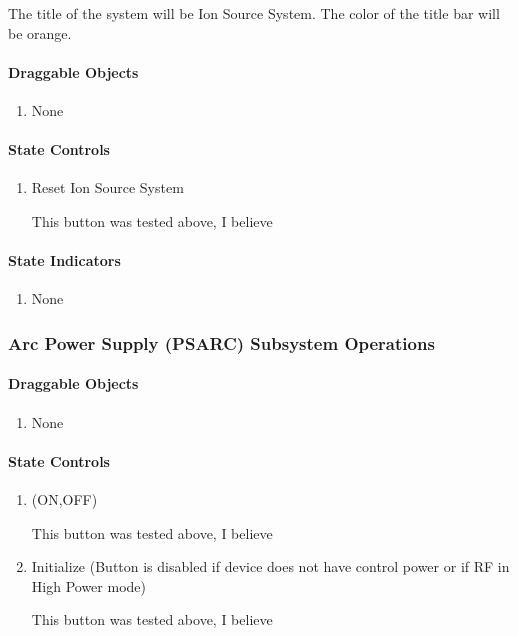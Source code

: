 \documentclass[11pt]{book}		%
\begin{document}
The title of the system will be Ion Source System.  The color of the title bar will be orange.

\paragraph{Draggable Objects}

\begin{enumerate}
 \item None
\end{enumerate}

\paragraph{State Controls}

\begin{enumerate}
 \item Reset Ion Source System

\color{red}
This button was tested above, I believe
\color{black}

\end{enumerate}

\paragraph{State Indicators}

\begin{enumerate}
 \item None
\end{enumerate}


\subsubsection{Arc Power Supply (PSARC) Subsystem Operations}

\paragraph{Draggable Objects}

\begin{enumerate}
 \item None
\end{enumerate}

\paragraph{State Controls}

\begin{enumerate}
 \item (ON,OFF)

\color{red}
This button was tested above, I believe
\color{black}

 \item Initialize (Button is disabled if device does not have control power or if RF in High Power mode)

\color{red}
This button was tested above, I believe
\color{black}

\end{enumerate}
\end{document}
